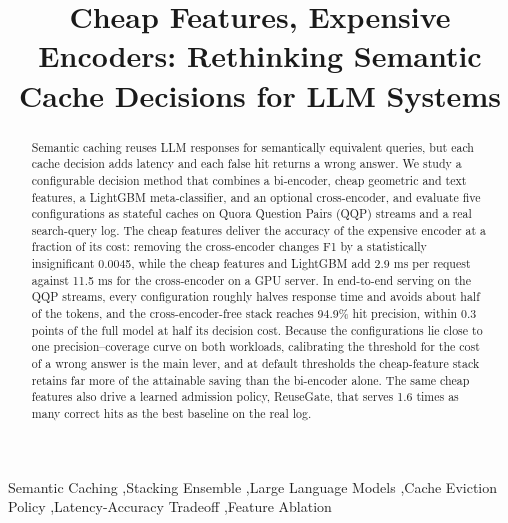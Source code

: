 \documentclass[authoryear,preprint,review,12pt]{elsarticle}
\begin{document}
\begin{frontmatter}

\title{Cheap Features, Expensive Encoders: Rethinking Semantic Cache Decisions for LLM Systems}

\begin{abstract}
Semantic caching reuses LLM responses for semantically equivalent queries, but each cache decision adds latency and each false hit returns a wrong answer. We study a configurable decision method that combines a bi-encoder, cheap geometric and text features, a LightGBM meta-classifier, and an optional cross-encoder, and evaluate five configurations as stateful caches on Quora Question Pairs (QQP) streams and a real search-query log. The cheap features deliver the accuracy of the expensive encoder at a fraction of its cost: removing the cross-encoder changes F1 by a statistically insignificant 0.0045, while the cheap features and LightGBM add 2.9 ms per request against 11.5 ms for the cross-encoder on a GPU server. In end-to-end serving on the QQP streams, every configuration roughly halves response time and avoids about half of the tokens, and the cross-encoder-free stack reaches 94.9\% hit precision, within 0.3 points of the full model at half its decision cost. Because the configurations lie close to one precision--coverage curve on both workloads, calibrating the threshold for the cost of a wrong answer is the main lever, and at default thresholds the cheap-feature stack retains far more of the attainable saving than the bi-encoder alone. The same cheap features also drive a learned admission policy, ReuseGate, that serves 1.6 times as many correct hits as the best baseline on the real log.
\end{abstract}

%

\begin{keyword}
Semantic Caching \sep Stacking Ensemble \sep Large Language Models \sep Cache Eviction Policy \sep Latency-Accuracy Tradeoff \sep Feature Ablation
\end{keyword}

\end{frontmatter}
\end{document}
